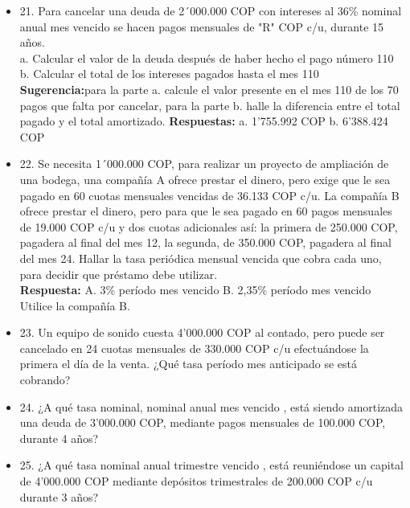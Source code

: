 \begin{itemize}
 \item 21. Para cancelar una deuda de 2´000.000 COP con intereses al 36\% nominal anual mes vencido se hacen pagos mensuales de  "R" COP c/u, durante 15 años.\\
       a. Calcular el valor de la deuda después de haber hecho el pago número 110\\
       b. Calcular el total de los intereses pagados hasta el mes 110\\
       \textbf{Sugerencia:}para la parte a. calcule el valor presente en el mes 110  de los 70 pagos que falta por cancelar, para la parte b. halle la diferencia entre el total pagado y el total amortizado.
       \textbf{Respuestas:} a.  1'755.992 COP \hspace{1,5 cm} b. 6'388.424 COP\\
       \medskip

 \item 22. Se necesita 1´000.000 COP, para realizar un proyecto de ampliación de una bodega, una compañía A ofrece prestar el dinero, pero exige que le sea pagado en 60 cuotas mensuales vencidas de 36.133 COP c/u. La compañía B ofrece prestar el dinero, pero para que le sea pagado en 60 pagos mensuales de 19.000 COP c/u y dos cuotas adicionales así: la primera de 250.000 COP, pagadera al final del mes 12, la segunda, de 350.000 COP, pagadera al final del mes 24. Hallar la tasa periódica mensual vencida que cobra cada uno, para decidir que préstamo debe utilizar.\\
       \textbf{Respuesta:} A. 3\% período mes vencido  \hspace{0,5 cm}              B. 2,35\% período mes vencido\\
       Utilice la compañía B.\\
       \medskip

 \item 23. Un equipo de sonido cuesta 4'000.000 COP al contado, pero puede ser cancelado en 24 cuotas mensuales de 330.000 COP c/u efectuándose la primera el día de la venta. ¿Qué tasa período mes anticipado se está cobrando?\\
       \medskip

 \item 24. ¿A qué tasa nominal, nominal anual mes vencido , está siendo amortizada una deuda de 3'000.000 COP, mediante pagos mensuales de 100.000 COP, durante 4 años?\\
       \medskip

 \item 25. ¿A qué tasa nominal anual trimestre vencido , está reuniéndose un capital de 4'000.000 COP mediante depósitos trimestrales de 200.000 COP c/u durante 3 años?\\
       \medskip


\end{itemize}
